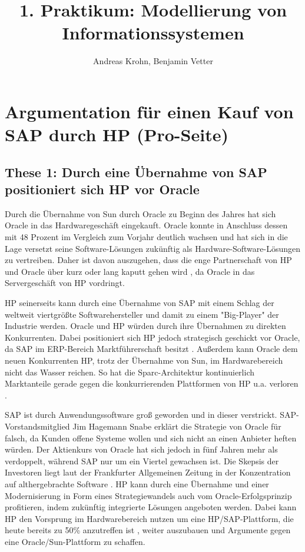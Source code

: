 \documentclass[a4paper,10pt,left=1.5cm,right=1.5cm,top=1.5cm,bottom=1.5cm]{article}
\title{1. Praktikum: Modellierung von Informationssystemen}
\author{Andreas Krohn, Benjamin Vetter}
\begin{document}
\maketitle


\section*{Argumentation für einen Kauf von SAP durch HP (Pro-Seite)}

\subsection*{These 1: Durch eine Übernahme von SAP positioniert sich HP vor Oracle}

Durch die Übernahme von Sun durch Oracle zu Beginn des Jahres hat sich Oracle in das Hardwaregeschäft eingekauft.
Oracle konnte in Anschluss dessen mit 48 Prozent im Vergleich zum Vorjahr deutlich wachsen \cite{oraclegrows} und hat sich in die Lage versetzt seine Software-Lösungen zukünftig als Hardware-Software-Lösungen zu vertreiben.
Daher ist davon auszugehen, dass die enge Partnerschaft von HP und Oracle über kurz oder lang kaputt gehen wird \cite{oraclesun}, da Oracle in das Servergeschäft von HP vordringt.

HP seinerseits kann durch eine Übernahme von SAP mit einem Schlag der weltweit viertgrößte Softwarehersteller \cite{sap} und damit zu einem "Big-Player" der Industrie werden.
Oracle und HP würden durch ihre Übernahmen zu direkten Konkurrenten.
Dabei positioniert sich HP jedoch strategisch geschickt vor Oracle, da SAP im ERP-Bereich Marktführerschaft besitzt \cite{erpmarket}.
Außerdem kann Oracle dem neuen Konkurrenten HP, trotz der Übernahme von Sun, im Hardwarebereich nicht das Wasser reichen.
So hat die Sparc-Architektur kontinuierlich Marktanteile gerade gegen die konkurrierenden Plattformen von HP u.a. verloren \cite{sparc}.

SAP ist durch Anwendungssoftware groß geworden und in dieser verstrickt.
SAP-Vorstandsmitglied Jim Hagemann Snabe erklärt die Strategie von Oracle für falsch, da Kunden offene Systeme wollen und sich nicht an einen Anbieter heften würden.
Der Aktienkurs von Oracle hat sich jedoch in fünf Jahren mehr als verdoppelt, während SAP nur um ein Viertel gewachsen ist.
Die Skepsis der Investoren liegt laut der Frankfurter Allgemeinen Zeitung in der Konzentration auf althergebrachte Software \cite{faz}.
HP kann durch eine Übernahme und einer Modernisierung in Form eines Strategiewandels auch vom Oracle-Erfolgsprinzip profitieren, indem zukünftig integrierte Lösungen angeboten werden.
Dabei kann HP den Vorsprung im Hardwarebereich nutzen um eine HP/SAP-Plattform, 
die heute bereits zu 50\% anzutreffen ist \cite{50percent}, 
weiter auszubauen und Argumente gegen eine Oracle/Sun-Plattform zu schaffen.
\end{document}
